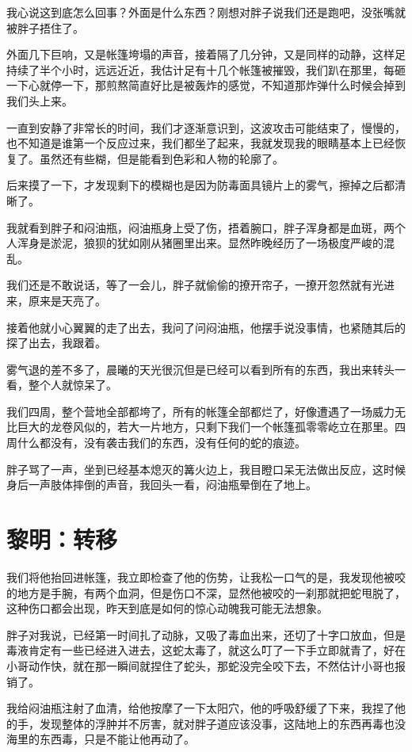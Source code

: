 我心说这到底怎么回事？外面是什么东西？刚想对胖子说我们还是跑吧，没张嘴就被胖子捂住了。

外面几下巨响，又是帐篷垮塌的声音，接着隔了几分钟，又是同样的动静，这样足持续了半个小时，远远近近，我估计足有十几个帐篷被摧毁，我们趴在那里，每砸一下心就停一下，那煎熬简直好比是被轰炸的感觉，不知道那炸弹什么时候会掉到我们头上来。

一直到安静了非常长的时间，我们才逐渐意识到，这波攻击可能结束了，慢慢的，也不知道是谁第一个反应过来，我们都坐了起来，我就发现我的眼睛基本上已经恢复了。虽然还有些糊，但是能看到色彩和人物的轮廓了。

后来摸了一下，才发现剩下的模糊也是因为防毒面具镜片上的雾气，擦掉之后都清晰了。

我就看到胖子和闷油瓶，闷油瓶身上受了伤，捂着腕口，胖子浑身都是血斑，两个人浑身是淤泥，狼狈的犹如刚从猪圈里出来。显然昨晚经历了一场极度严峻的混乱。

我们还是不敢说话，等了一会儿，胖子就偷偷的撩开帘子，一撩开忽然就有光进来，原来是天亮了。

接着他就小心翼翼的走了出去，我问了问闷油瓶，他摆手说没事情，也紧随其后的探了出去，我跟着。

雾气退的差不多了，晨曦的天光很沉但是已经可以看到所有的东西，我出来转头一看，整个人就惊呆了。

我们四周，整个营地全部都垮了，所有的帐篷全部都烂了，好像遭遇了一场威力无比巨大的龙卷风似的，若大一片地方，只剩下我们一个帐篷孤零零屹立在那里。四周什么都没有，没有袭击我们的东西，没有任何的蛇的痕迹。

胖子骂了一声，坐到已经基本熄灭的篝火边上，我目瞪口呆无法做出反应，这时候身后一声肢体摔倒的声音，我回头一看，闷油瓶晕倒在了地上。

\chapter{黎明：转移}

我们将他抬回进帐篷，我立即检查了他的伤势，让我松一口气的是，我发现他被咬的地方是手腕，有两个血洞，但是伤口不深，显然他被咬的一刹那就把蛇甩脱了，这种伤口都会出现，昨天到底是如何的惊心动魄我可能无法想象。

胖子对我说，已经第一时间扎了动脉，又吸了毒血出来，还切了十字口放血，但是毒液肯定有一些已经进入进去，这蛇太毒了，就这么叮了一下手立即就青了，好在小哥动作快，就在那一瞬间就捏住了蛇头，那蛇没完全咬下去，不然估计小哥也报销了。

我给闷油瓶注射了血清，给他按摩了一下太阳穴，他的呼吸舒缓了下来，我捏了他的手，发现整体的浮肿并不厉害，就对胖子道应该没事，这陆地上的东西再毒也没海里的东西毒，只是不能让他再动了。


